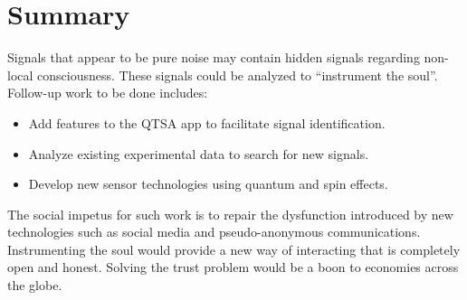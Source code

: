 \section{Summary}

Signals that appear to be pure noise may contain hidden signals regarding non-local consciousness.
These signals could be analyzed to ``instrument the soul''.
Follow-up work to be done includes:

\begin{itemize}
	\item Add features to the QTSA app to facilitate signal identification.
	\item Analyze existing experimental data to search for new signals.
	\item Develop new sensor technologies using quantum and spin effects.
\end{itemize}

The social impetus for such work is to repair the dysfunction introduced by
new technologies such as social media and pseudo-anonymous communications.
Instrumenting the soul would provide a new way of interacting that is completely open and honest.
Solving the trust problem would be a boon to economies across the globe.
